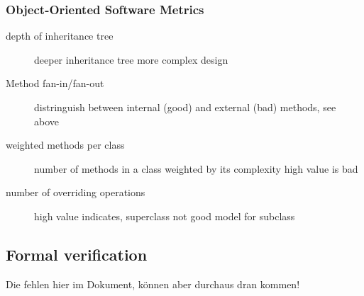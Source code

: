 \documentclass[a4paper, 10pt]{article}
\begin{document}
\subsubsection{Object-Oriented Software Metrics}
\begin{description}
	\item[depth of inheritance tree] deeper inheritance tree \follows more complex design
	\item[Method fan-in/fan-out] distringuish between internal (good) and external (bad) methods, see above
	\item[weighted methods per class] number of methods in a class weighted by its complexity \follows high value is bad
	\item[number of overriding operations] high value indicates, superclass not good model for subclass
\end{description}

\subsection{Formal verification}
Die fehlen hier im Dokument, können aber durchaus dran kommen!
\end{document}
